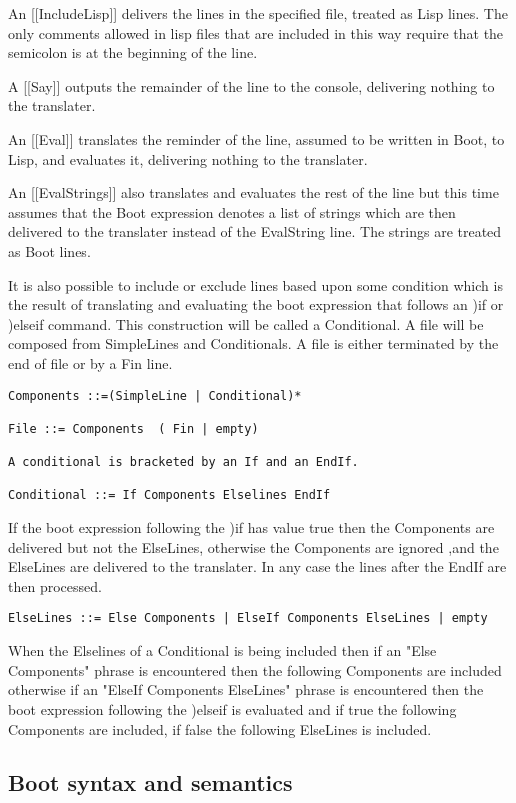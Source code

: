 \documentclass{article}
\begin{document}
An [[IncludeLisp]] delivers the lines in the specified file, treated as Lisp
lines. The only comments allowed in lisp files that are included in
this way require that the semicolon is at the beginning of the line.

A [[Say]] outputs the remainder of the line to the console,
   delivering nothing to the translater.

An [[Eval]] translates the reminder of the line, assumed to be
   written in Boot, to Lisp, and evaluates it, delivering nothing to
   the translater.

An [[EvalStrings]] also translates and evaluates the rest of the line
   but this time assumes that the Boot expression denotes a list
   of strings which are then delivered to the translater
   instead of the EvalString line. The strings are treated as Boot lines.

It is also possible to include or exclude lines based upon some
condition which is the result of translating and evaluating
the boot expression that follows an )if or )elseif command.
This construction will be called a Conditional. A file will be
composed from SimpleLines and Conditionals. A file is either
terminated by the end of file or by a Fin line.
\begin{verbatim}
Components ::=(SimpleLine | Conditional)*

File ::= Components  ( Fin | empty)

A conditional is bracketed by an If and an EndIf.

Conditional ::= If Components Elselines EndIf
\end{verbatim}

If the boot expression following the )if has value true then the
Components are delivered but not the ElseLines,
otherwise the Components are ignored ,and the ElseLines
are delivered to the translater. In any case the lines after
the EndIf are then processed.
\begin{verbatim}
ElseLines ::= Else Components | ElseIf Components ElseLines | empty
\end{verbatim}

When the Elselines of a Conditional is being included then if an
"Else Components" phrase is encountered then the following
Components are included
otherwise if an "ElseIf Components ElseLines" phrase is encountered then
the boot expression following the )elseif is evaluated and
if true the following Components are included, if false the
following ElseLines is included.


\subsection{Boot syntax and semantics}
\end{document}

